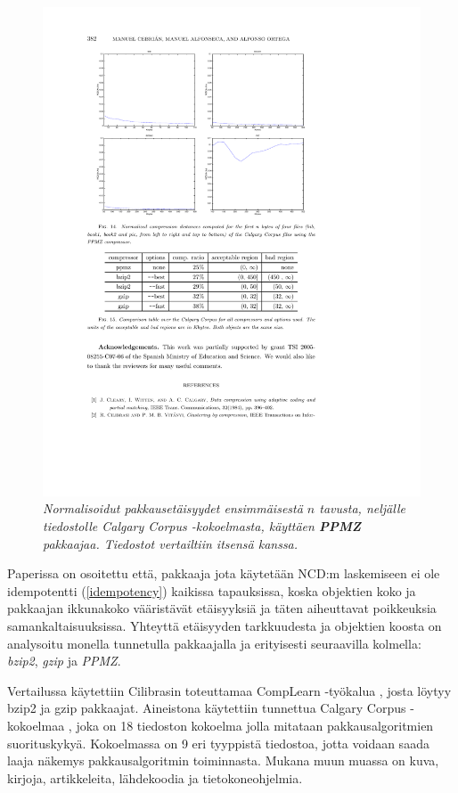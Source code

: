 \documentclass[12pt,finnish]{tktltiki2}
\theoremstyle{definition}
\theoremstyle{remark}
\begin{document}
    \begin{figure}[!htb]
        \immediate{}
      \includegraphics{img/ppmz}
      \caption{\emph{Normalisoidut pakkausetäisyydet ensimmäisestä $n$ tavusta, neljälle tiedostolle Calgary Corpus -kokoelmasta, käyttäen \textbf{PPMZ} pakkaajaa. Tiedostot vertailtiin itsensä kanssa.} \cite{cebrian2005common}}
      \label{fig:ppmz}
    \end{figure}

      Paperissa \cite{cebrian2005common} on osoitettu että, pakkaaja jota käytetään NCD:m laskemiseen ei ole idempotentti (\ref{idempotency}) kaikissa tapauksissa, koska objektien koko ja pakkaajan ikkunakoko vääristävät etäisyyksiä ja täten aiheuttavat poikkeuksia samankaltaisuuksissa. Yhteyttä etäisyyden tarkkuudesta ja objektien koosta on analysoitu monella tunnetulla pakkaajalla ja erityisesti seuraavilla kolmella:  \emph{bzip2}, \emph{gzip} ja \emph{PPMZ}.

      Vertailussa käytettiin Cilibrasin toteuttamaa CompLearn -työkalua \cite{complearn}, josta löytyy bzip2 ja gzip pakkaajat.
      Aineistona käytettiin tunnettua Calgary Corpus -kokoelmaa \cite{calgarycorpus}, joka on 18 tiedoston kokoelma jolla mitataan pakkausalgoritmien suorituskykyä.
      Kokoelmassa on 9 eri tyyppistä tiedostoa, jotta voidaan saada laaja näkemys pakkausalgoritmin toiminnasta.
      Mukana muun muassa on kuva, kirjoja, artikkeleita, lähdekoodia ja tietokoneohjelmia.
\end{document}
